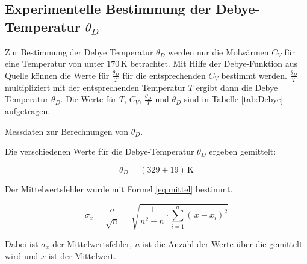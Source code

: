 \subsection[Experimentelle Bestimmung der Debye-Temperatur]{Experimentelle Bestimmung der Debye-Temperatur $\theta_D$}
\label{sec:debye_temp}

Zur Bestimmung der Debye Temperatur $\theta_D$ werden nur die Molwärmen $C_V$ für eine Temperatur von unter $170 \, \mathrm{K}$ betrachtet. Mit Hilfe der Debye-Funktion aus Quelle \cite{Anleitung} können die Werte für $\frac{\theta_D}{T}$ für die entsprechenden $C_V$ bestimmt werden. $\frac{\theta_D}{T}$ multipliziert mit der entsprechenden Temperatur $T$ ergibt dann die Debye Temperatur $\theta_D$. Die Werte für $T$, $C_V$, $\frac{\theta_D}{T}$ und $\theta_D$ sind in Tabelle \ref{tab:Debye} aufgetragen.

\begin{table}
    \centering
    \caption{Messdaten zur Berechnungen von $\theta_D$.}
    \label{tab:Debye}
\end{table}

Die verschiedenen Werte für die Debye-Temperatur $\theta_D$ ergeben gemittelt:

\begin{equation*}
    \theta_D = (329 \pm 19) \, \mathrm{K}
    \label{eq:debye}
\end{equation*}

Der Mittelwertsfehler wurde mit Formel \eqref{eq:mittel} bestimmt.

\begin{equation}
    \sigma_{\overline{x}} = \frac{\sigma}{\sqrt{n}} = \sqrt{\frac{1}{n^2 - n} \cdot \sum\limits_{i=1}^{n} \left( \, \overline{x} - x_i \right)^2}
    \label{eq:mittel}
\end{equation}

Dabei ist $\sigma_{\overline{x}}$ der Mittelwertsfehler, $n$ ist die Anzahl der Werte über die gemittelt wird und $\overline{x}$ ist der Mittelwert.

